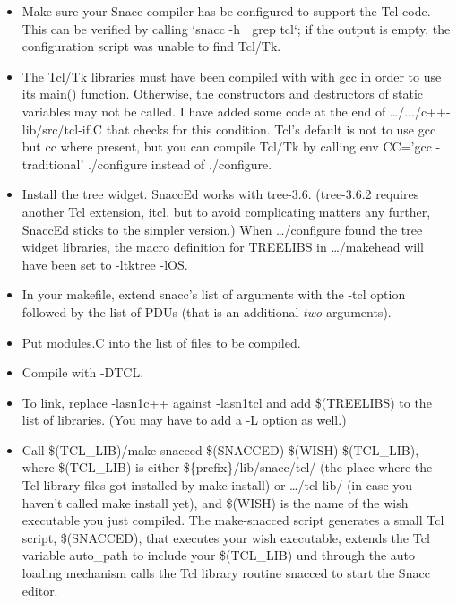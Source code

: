 \begin{itemize}
  \item
    Make sure your Snacc compiler has be configured to support the Tcl code.
    This can be verified by calling {\ufn `snacc -h | grep tcl`}; if the output is empty, the configuration script was unable to find Tcl/Tk.
  \item
    The Tcl/Tk libraries must have been compiled with with gcc in order to use its {\C main()} function.
    Otherwise, the constructors and destructors of static variables may not be called.
    I have added some code at the end of {\ufn \dots/.../c++-lib/src/tcl-if.C} that checks for this condition.
    \newline
    Tcl's default is not to use gcc but cc where present, but you can compile Tcl/Tk by calling {\ufn env CC='gcc -traditional' ./configure} instead of {\ufn ./configure}.
  \item
    Install the tree widget.
    SnaccEd works with tree-3.6.
    (tree-3.6.2 requires another Tcl extension, itcl, but to avoid complicating matters any further, SnaccEd sticks to the simpler version.)
    When {\ufn \dots/configure} found the tree widget libraries, the macro definition for {\Make TREELIBS} in {\ufn \dots/makehead} will have been set to {\ufn -ltktree -lOS}.
  \item
    In your makefile, extend {\ufn snacc}'s list of arguments with the {\ufn -tcl} option followed by the list of PDUs (that is an additional \emph{two} arguments).
  \item
    Put {\ufn modules.C} into the list of files to be compiled.
  \item
    Compile with {\ufn -DTCL}.
  \item
    To link, replace {\ufn -lasn1c++} against {\ufn -lasn1tcl} and add {\ufn \$(TREELIBS)} to the list of libraries.
    (You may have to add a {\ufn -L} option as well.)
  \item
    Call {\ufn \$(TCL\_LIB)/make-snacced \$(SNACCED) \$(WISH) \$(TCL\_LIB)}, where {\ufn \$(TCL\_LIB)} is either {\ufn \$\{prefix\}/lib/snacc/tcl/} (the place where the Tcl library files got installed by {\ufn make install}) or {\ufn \dots/tcl-lib/} (in case you haven't called {\ufn make install} yet), and {\ufn \$(WISH)} is the name of the wish executable you just compiled.
    The {\ufn make-snacced} script generates a small Tcl script, {\ufn \$(SNACCED)}, that executes your wish executable, extends the Tcl variable {\Tcl auto\_path} to include your {\ufn \$(TCL\_LIB)} und through the auto loading mechanism calls the Tcl library routine {\Tcl snacced} to start the Snacc editor.
\end{itemize}

